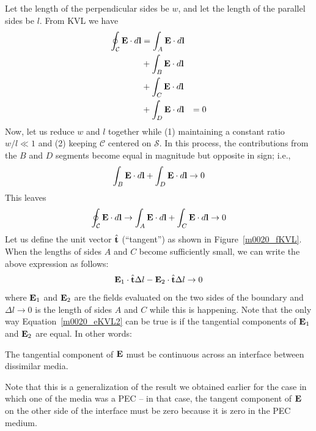 Let the length of the perpendicular sides be $w$, and let the length of the parallel sides be $l$.  
From KVL we have
% 
\begin{align}   
\oint_{\mathcal{C}}{ {\bf E} \cdot d{\bf l} } &= \int_A{ {\bf E} \cdot d{\bf l} } & \nonumber \\ 
                                &+\int_B{ {\bf E} \cdot d{\bf l} }  & \nonumber \\ 
                                &+\int_C{ {\bf E} \cdot d{\bf l} }  & \nonumber \\
                                &+\int_D{ {\bf E} \cdot d{\bf l} }  &= 0 
\end{align}
%  
Now, let us reduce $w$ and $l$ together while (1) maintaining a constant ratio $w/l\ll 1$ and (2) keeping $\mathcal{C}$ centered on $\mathcal{S}$.
In this process, the contributions from the $B$ and $D$ segments become equal in magnitude but opposite in sign; i.e., 
% 
\begin{equation}   
\int_B{ {\bf E} \cdot d{\bf l} } 
+\int_D{ {\bf E} \cdot d{\bf l} }
\to 0
\end{equation}
%
This leaves
% 
\begin{equation}   
\oint_{\mathcal{C}}{ {\bf E} \cdot d{\bf l} } \to \int_A{ {\bf E} \cdot d{\bf l} }+\int_C{ {\bf E} \cdot d{\bf l} }  \to 0 
\end{equation}
%
Let us define the unit vector $\hat{\bf t}$ (``tangent'') as shown in Figure~\ref{m0020_fKVL}.
When the lengths of sides $A$ and $C$ become sufficiently small, we can write the above expression as follows:
% 
\begin{equation}   
  {\bf E}_1 \cdot \hat{\bf t}\Delta l
- {\bf E}_2 \cdot \hat{\bf t}\Delta l 
\to 0
\label{m0020_eKVL2}
\end{equation}
%
where ${\bf E}_1$ and ${\bf E}_2$ are the fields evaluated on the two sides of the boundary and
$\Delta l\to 0$ is the length of sides $A$ and $C$ while this is happening.
Note that the only way Equation~\ref{m0020_eKVL2} can be true is if the tangential components of ${\bf E}_1$ and ${\bf E}_2$ are equal. In other words: 
%
\begin{mdframed}[backgroundcolor=yellow!20,nobreak=true] 
The tangential component of ${\bf E}$ must be continuous across an interface between dissimilar media. 
\end{mdframed}
%
Note that this is a generalization of the result we obtained earlier for the case in which one of the media was a PEC -- in that case, the tangent component of ${\bf E}$ on the other side of the interface must be zero because it is zero in the PEC medium.

